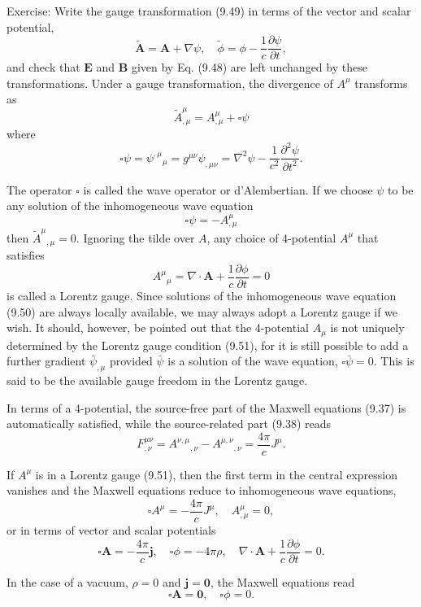 \documentclass[hyperref,UTF8]{ctexbook}
\begin{document}
Exercise: Write the gauge transformation (9.49) in terms of the vector and scalar potential,
$$
\tilde{\mathbf{A}}=\mathbf{A}+\nabla \psi, \quad \tilde{\phi}=\phi-\frac{1}{c} \frac{\partial \psi}{\partial t},
$$
and check that $\mathbf{E}$ and $\mathbf{B}$ given by Eq. (9.48) are left unchanged by these transformations.
Under a gauge transformation, the divergence of $A^\mu$ transforms as
$$
\tilde{A}_{, \mu}^\mu=A_{, \mu}^\mu+\square \psi
$$
where
$$
\square \psi=\psi^{, \mu}{ }_\mu=g^{\mu \nu} \psi_{, \mu \nu}=\nabla^2 \psi-\frac{1}{c^2} \frac{\partial^2 \psi}{\partial t^2} .
$$

The operator $\square$ is called the wave operator or d'Alembertian. If we choose $\psi$ to be any solution of the inhomogeneous wave equation
$$
\square \psi=-A_{, \mu}^\mu
$$
then $\tilde{A}^\mu{ }_{, \mu}=0$. Ignoring the tilde over $A$, any choice of 4-potential $A^\mu$ that satisfies
$$
A^\mu{ }_\mu=\nabla \cdot \mathbf{A}+\frac{1}{c} \frac{\partial \phi}{\partial t}=0
$$
is called a Lorentz gauge. Since solutions of the inhomogeneous wave equation (9.50) are always locally available, we may always adopt a Lorentz gauge if we wish. It should, however, be pointed out that the 4-potential $A_\mu$ is not uniquely determined by the Lorentz gauge condition (9.51), for it is still possible to add a further gradient $\bar{\psi}_{, \mu}$ provided $\bar{\psi}$ is a solution of the wave equation, $\square \bar{\psi}=0$. This is said to be the available gauge freedom in the Lorentz gauge.

In terms of a 4-potential, the source-free part of the Maxwell equations (9.37) is automatically satisfied, while the source-related part (9.38) reads
$$
F_{, \nu}^{\mu \nu}=A^{\nu, \mu}{ }_{, \nu}-A^{\mu, \nu}{ }_{, \nu}=\frac{4 \pi}{c} J^\mu .
$$

If $A^\mu$ is in a Lorentz gauge (9.51), then the first term in the central expression vanishes and the Maxwell equations reduce to inhomogeneous wave equations,
$$
\square A^\mu=-\frac{4 \pi}{c} J^\mu, \quad A_{, \mu}^\mu=0,
$$
or in terms of vector and scalar potentials
$$
\square \mathbf{A}=-\frac{4 \pi}{c} \mathbf{j}, \quad \square \phi=-4 \pi \rho, \quad \nabla \cdot \mathbf{A}+\frac{1}{c} \frac{\partial \phi}{\partial t}=0 .
$$

In the case of a vacuum, $\rho=0$ and $\mathbf{j}=\mathbf{0}$, the Maxwell equations read
$$
\square \mathbf{A}=\mathbf{0}, \quad \square \phi=0 .
$$
\end{document}

